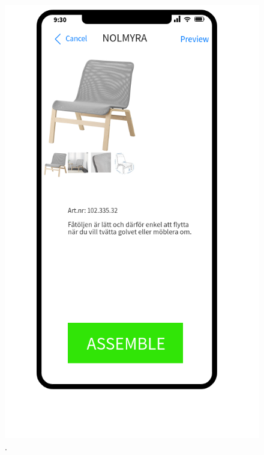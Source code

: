 \begin{figure}[!hbt]
\begin{center}
\includegraphics[height = 0.4\textheight]{./Images/Detail_view.png}
\caption{.}
\label{fig:detal-view}
\end{center}
\end{figure}



